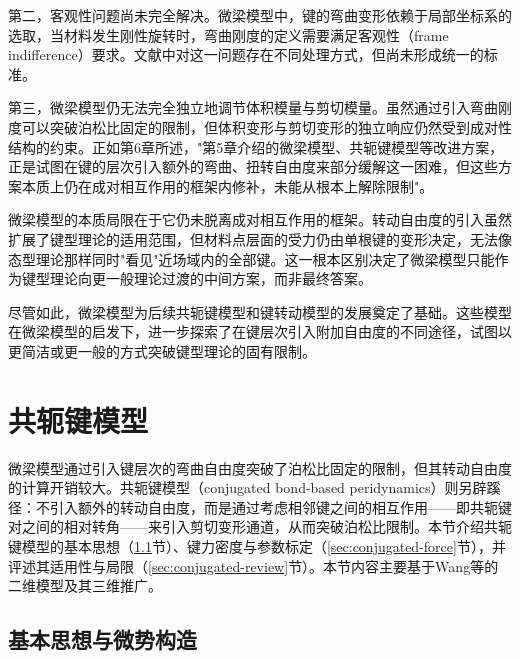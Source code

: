 第二，客观性问题尚未完全解决。微梁模型中，键的弯曲变形依赖于局部坐标系的选取，当材料发生刚性旋转时，弯曲刚度的定义需要满足客观性（frame indifference）要求。文献中对这一问题存在不同处理方式，但尚未形成统一的标准。

第三，微梁模型仍无法完全独立地调节体积模量与剪切模量。虽然通过引入弯曲刚度可以突破泊松比固定的限制，但体积变形与剪切变形的独立响应仍然受到成对性结构的约束。正如第6章所述，"第5章介绍的微梁模型、共轭键模型等改进方案，正是试图在键的层次引入额外的弯曲、扭转自由度来部分缓解这一困难，但这些方案本质上仍在成对相互作用的框架内修补，未能从根本上解除限制"。

\begin{remark}
  微梁模型的本质局限在于它仍未脱离成对相互作用的框架。转动自由度的引入虽然扩展了键型理论的适用范围，但材料点层面的受力仍由单根键的变形决定，无法像态型理论那样同时"看见"近场域内的全部键。这一根本区别决定了微梁模型只能作为键型理论向更一般理论过渡的中间方案，而非最终答案。
\end{remark}

尽管如此，微梁模型为后续共轭键模型和键转动模型的发展奠定了基础。这些模型在微梁模型的启发下，进一步探索了在键层次引入附加自由度的不同途径，试图以更简洁或更一般的方式突破键型理论的固有限制。


\section{共轭键模型}\label{sec:conjugated-bond}

微梁模型通过引入键层次的弯曲自由度突破了泊松比固定的限制，但其转动自由度的计算开销较大。共轭键模型（conjugated bond-based peridynamics）则另辟蹊径：不引入额外的转动自由度，而是通过考虑相邻键之间的相互作用——即共轭键对之间的相对转角——来引入剪切变形通道，从而突破泊松比限制。本节介绍共轭键模型的基本思想（\ref{sec:conjugated-idea}节）、键力密度与参数标定（\ref{sec:conjugated-force}节），并评述其适用性与局限（\ref{sec:conjugated-review}节）。本节内容主要基于Wang等\cite{WangZhouShou2017}的二维模型及其三维推广\cite{WangZhouWang2018}。

\subsection{基本思想与微势构造}\label{sec:conjugated-idea}

